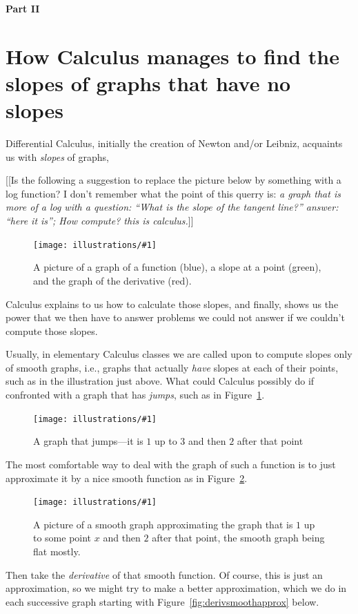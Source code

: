 \documentclass[11pt,draft]{article}
\newcommand{\ill}[3]{ 
   \begin{figure}[H]
   \begin{center}
   \texttt{[image: illustrations/\#1]}
   \caption{#3}
   \end{center}
    \end{figure}
}
\theoremstyle{plain}
\theoremstyle{definition}
\numberwithin{equation}{section}
\numberwithin{figure}{section}
\numberwithin{table}{section}
\begin{document}
       
\bigskip   
\bigskip   
\bigskip   
\bigskip   
\centerline{\Large\bf Part II }
    
\bigskip 
\section{How Calculus manages to find the slopes of graphs that  
have no slopes}   
   
Differential Calculus, initially the creation of Newton and/or
Leibniz, acquaints us with {\em slopes} of graphs,
   

[[Is the following a suggestion to replace the picture below by something with a log function?  I don't remember what the point of this querry is: {\em a graph that is more of a log with a question: ``What is the slope
of the tangent line?'' answer: ``here it is''; How compute?  this is
calculus.}]] 
   
   
\ill{graph_slope_deriv}{0.5}{A picture of a graph of a function (blue), a slope at a point (green), and the graph of the derivative (red).}
      
\noindent Calculus explains to us how to calculate those slopes, and
finally, shows us the power that we then have to answer problems we
could not answer if we couldn't compute those slopes.


Usually, in elementary Calculus classes we are called upon to compute
slopes only of smooth graphs, i.e., graphs that actually {\em have}
slopes at each of their points, such as in the illustration just
above.  What could Calculus possibly do if confronted with a graph
that has {\em jumps}, such as in Figure~\ref{fig:jump}.
 
\ill{jump}{0.5}{A graph that jumps---it is $1$ up to $3$ and then $2$ after that point\label{fig:jump}}
  
The most comfortable way to deal with the graph of such a function is
to just approximate it by a nice smooth function as in
Figure~\ref{fig:jumpsmooth}.
    
   
\ill{jump-smooth}{0.5}{A picture of a smooth graph approximating the
  graph that is $1$ up to some point $x$ and then $2$ after that
  point, the smooth graph being flat mostly.\label{fig:jumpsmooth}}


Then take the {\em derivative} of that smooth function.  Of course,
this is just an approximation, so we might try to make a better
approximation, which we do in each successive graph starting
with Figure~\ref{fig:derivsmoothapprox} below.
\end{document}
